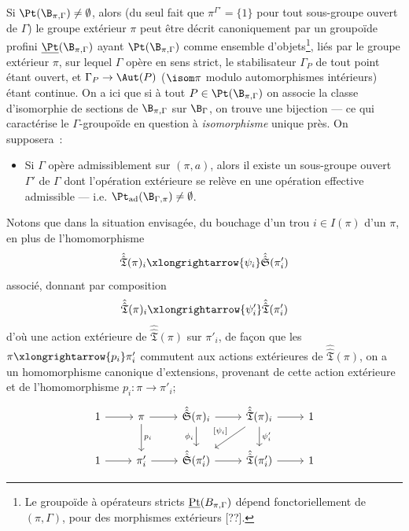 Si ${\Pt}(\B_{\pi,\Gamma})\ne\emptyset$, alors (du seul fait que $\pi^{\Gamma'}=\{1\}$ pour tout sous-groupe ouvert de $\Gamma$) le groupe extérieur $\pi$ peut être décrit canoniquement par un groupoïde profini $\underline{{\Pt}}(\B_{\pi,\Gamma})$ ayant ${\Pt}(\B_{\pi,\Gamma})$ comme ensemble d'objets\footnote{Le groupoïde à opérateurs stricts $\underline{{\rm Pt}}(B_{\pi,\Gamma})$ dépend fonctoriellement de $(\pi,\Gamma)$, pour des morphismes extérieurs [??].}, liés par le groupe extérieur $\pi$, sur lequel $\Gamma$ opère en sens strict, le stabilisateur $\Gamma_P$ de tout point étant ouvert, et $\Gamma_P\to{\Aut}(P)$ ($ \isom \pi$ modulo automorphismes intérieurs) étant continue. On a ici que si à tout $P\in{\Pt}(\B_{\pi,\Gamma})$ on associe la classe d'isomorphie de sections de $\B_{\pi,\Gamma}$ sur $\B_\Gamma$, on trouve une bijection --- ce qui caractérise le $\Gamma$-groupoïde en question à \emph{isomorphisme} unique près. On supposera~:
\begin{itemize}
	\item[(4)] Si $\Gamma$ opère admissiblement sur $(\pi,a)$, alors il existe un sous-groupe ouvert $\Gamma'$ de $\Gamma$ dont l'opération extérieure se relève en une opération effective admissible --- i.e. ${\Pt}_{\operatorname{ad}}(\B_{\Gamma,\pi})\ne\emptyset$.
\end{itemize}
Notons que dans la situation envisagée, du bouchage d'un trou $i\in I(\pi)$ d'un $\pi$, en plus de l'homomorphisme
$$
\hat{\hat{\mathfrak{T}}}(\pi)_i\xlongrightarrow{\psi_i}
\hat{\hat{\mathfrak{S}}}(\pi'_i)
$$
associé, donnant par composition
$$
\hat{\hat{\mathfrak{T}}}(\pi)_i\xlongrightarrow{\psi'_i}
\hat{\hat{\mathfrak{T}}}(\pi'_i)
$$
d'où une action extérieure de $\hat{\hat{\mathfrak{T}}}(\pi)$ sur $\pi'_i$, de fa\c{c}on que les $\pi\xlongrightarrow{p_i}\pi_i'$ commutent aux actions extérieures de $\hat{\hat{\mathfrak{T}}} (\pi)$, on a un homomorphisme canonique d'extensions, provenant de cette action extérieure et de l'homomorphisme $p_i:\pi\to\pi'_i$;
\[\begin{tikzcd}
	1 & \pi & {\hat{\hat{\mathfrak{S}}}(\pi)_i} & {\hat{\hat{\mathfrak{T}}} (\pi)_i} & 1 \\
	1 & {\pi'_i} & {\hat{\hat{\mathfrak{S}}}(\pi'_i)} & {\hat{\hat{\mathfrak{T}}}(\pi'_i)} & 1
	\arrow[from=2-4, to=2-5]
	\arrow[from=1-4, to=1-5]
	\arrow[from=2-3, to=2-4]
	\arrow[from=1-3, to=1-4]
	\arrow[from=2-2, to=2-3]
	\arrow[from=1-2, to=1-3]
	\arrow[from=2-1, to=2-2]
	\arrow[from=1-1, to=1-2]
	\arrow["{p_i}", from=1-2, to=2-2]
	\arrow["{\phi_i}"', from=1-3, to=2-3]
	\arrow["{\psi'_i}", from=1-4, to=2-4]
	\arrow["{[\psi_i]}"', from=1-4, to=2-3]
\end{tikzcd}\]
